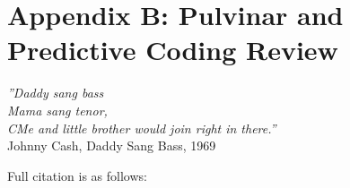 \section{Appendix B: Pulvinar and Predictive Coding Review} 
\begin{flushright}
    \textit{''Daddy sang bass\\
    Mama sang tenor, \\
    CMe and little brother would join right in there.''}\\
    Johnny Cash, Daddy Sang Bass, 1969
\end{flushright}
\label{appendix_public_articles}

Full citation is as follows: 


